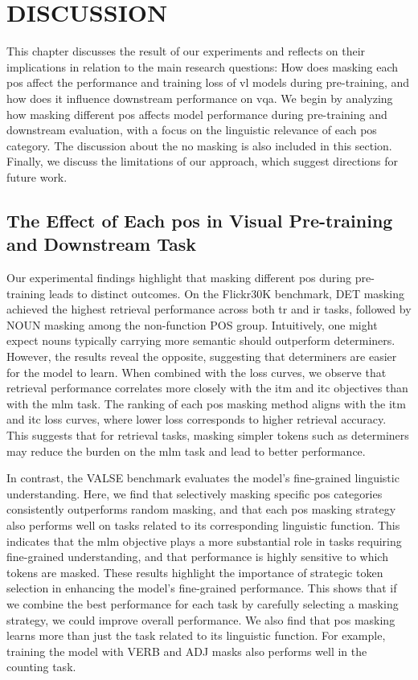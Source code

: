 \chapter{DISCUSSION}
This chapter discusses the result of our experiments and reflects on their implications in relation to the main research questions: How does masking each \acrshort{pos} affect the performance and training loss of \acrshort{vl} models during pre-training, and how does it influence downstream performance on \acrshort{vqa}.
We begin by analyzing how masking different \acrshort{pos} affects model performance during pre-training and downstream evaluation, with a focus on the linguistic relevance of each \acrshort{pos} category.
The discussion about the no masking is also included in this section.
Finally, we discuss the limitations of our approach, which suggest directions for future work.

\section{The Effect of Each \acrshort{pos} in Visual Pre-training and Downstream Task}
Our experimental findings highlight that masking different \acrshort{pos} during pre-training leads to distinct outcomes.
On the Flickr30K benchmark, DET masking achieved the highest retrieval performance across both \acrshort{tr} and \acrshort{ir} tasks, followed by NOUN masking among the non-function POS group.
Intuitively, one might expect nouns typically carrying more semantic should outperform determiners.
However, the results reveal the opposite, suggesting that determiners are easier for the model to learn.
When combined with the loss curves, we observe that retrieval performance correlates more closely with the \acrshort{itm} and \acrshort{itc} objectives than with the \acrshort{mlm} task.
The ranking of each \acrshort{pos} masking method aligns with the \acrshort{itm} and \acrshort{itc} loss curves, where lower loss corresponds to higher retrieval accuracy.
This suggests that for retrieval tasks, masking simpler tokens such as determiners may reduce the burden on the \acrshort{mlm} task and lead to better performance.

In contrast, the VALSE benchmark evaluates the model's fine-grained linguistic understanding.
Here, we find that selectively masking specific \acrshort{pos} categories consistently outperforms random masking, and that each \acrshort{pos} masking strategy also performs well on tasks related to its corresponding linguistic function.
This indicates that the \acrshort{mlm} objective plays a more substantial role in tasks requiring fine-grained understanding, and that performance is highly sensitive to which tokens are masked.
These results highlight the importance of strategic token selection in enhancing the model’s fine-grained performance.
This shows that if we combine the best performance for each task by carefully selecting a masking strategy, we could improve overall performance.
We also find that \acrshort{pos} masking learns more than just the task related to its linguistic function. For example, training the model with VERB and ADJ masks also performs well in the counting task.


